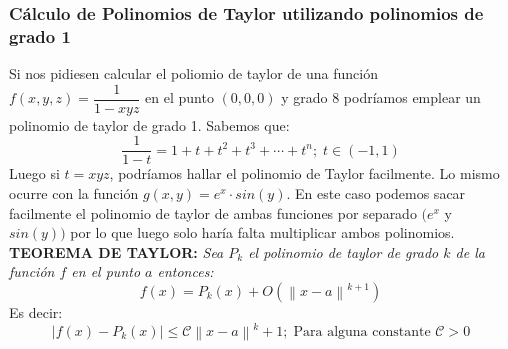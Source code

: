 \documentclass[11pt]{article}
\providecommand{\norm}[1]{\left\lVert #1 \right \rVert}
\providecommand{\abs}[1]{\left\lvert #1\right\rvert}
\providecommand{\norm}[1]{\left\lVert #1 \right \rVert}
\providecommand{\abs}[1]{\left\lvert #1\right\rvert}
\theoremstyle{plain}
\begin{document}
            \subsubsection{Cálculo de Polinomios de Taylor utilizando polinomios de grado 1} %
            \label{subsub:calculo_de_polinomios_de_taylor_utilizando_polinomios_de_grado_1}
            Si nos pidiesen calcular el poliomio de taylor de una función $f(x,y,z)=\dfrac{1}{1-xyz}$ en el punto $(0,0,0)$ y grado 8 podríamos emplear un polinomio de taylor de grado 1. Sabemos que:
            \[\frac{1}{1-t} = 1 + t + t^2 + t^3 + \cdots + t^n; \; t\in(-1,1)\]
            Luego si $t=xyz$, podríamos hallar el polinomio de Taylor facilmente. Lo mismo ocurre con la función $g(x,y) = e^x \cdot sin(y)$. En este caso podemos sacar facilmente el polinomio de taylor de ambas funciones por separado $(e^x$ y $sin(y))$ por lo que luego solo haría falta multiplicar ambos polinomios.\\

            \textbf{TEOREMA DE TAYLOR:} \textit{Sea $P_k$ el polinomio de taylor de grado $k$ de la función $f$ en el punto $a$ entonces:}
            \[f(x) = P_k(x) + O(\norm{x-a}^{k+1})\]
            Es decir:
            \[\abs{f(x) - P_k(x)} \le \mathcal{C}\norm{x-a}^k+1; \; \text{Para alguna constante } \mathcal{C}>0\]
\end{document}
